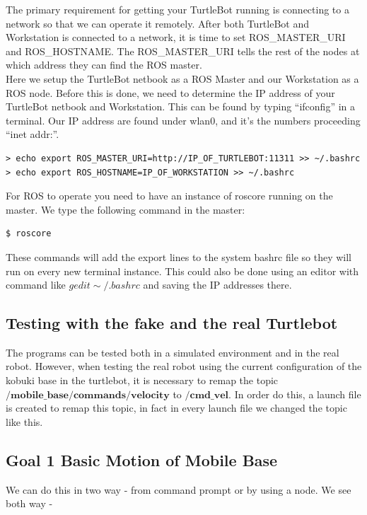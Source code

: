 \documentclass[10pt,a4paper]{article}
\begin{document}
The primary requirement for getting your TurtleBot running is connecting to a network so that we can operate it remotely. After both TurtleBot and Workstation is connected to a network, it is time to set ROS\_MASTER\_URI and ROS\_HOSTNAME. The ROS\_MASTER\_URI tells the rest of the nodes at which address they can find the ROS master.\\

Here we setup the TurtleBot netbook as a ROS Master and our Workstation as a ROS node. Before this is done, we need to determine the IP address of your TurtleBot netbook and Workstation. This can be found by typing ``ifconfig'' in a terminal. Our IP address are found under wlan0, and it's the numbers proceeding ``inet addr:''.

\begin{lstlisting}[frame=single] 
> echo export ROS_MASTER_URI=http://IP_OF_TURTLEBOT:11311 >> ~/.bashrc
> echo export ROS_HOSTNAME=IP_OF_WORKSTATION >> ~/.bashrc
\end{lstlisting}
For ROS to operate you need to have an instance of roscore running on the master. We type the following command in the master:

\begin{lstlisting}[frame=single] 
$ roscore
\end{lstlisting}
These commands will add the export lines to the system bashrc file so they will run on every new terminal instance. This could also be done using an editor with command like $gedit \sim/.bashrc$ and saving the IP addresses there.

\subsection{Testing with the fake and the real Turtlebot}
The programs can be tested both in a simulated environment and in the real robot. However, when testing the real robot using the current configuration of the kobuki base in the turtlebot, it is necessary to remap the topic $\textbf{/mobile\_base/commands/velocity}$ to $/\textbf{cmd\_vel}$. In order do this, a launch file is created to remap this topic, in fact in every launch file we changed the topic like this.

\subsection{Goal 1 Basic Motion of Mobile Base}

We can do this in two way - from command prompt or by using a node. We see both way - 
\end{document}
